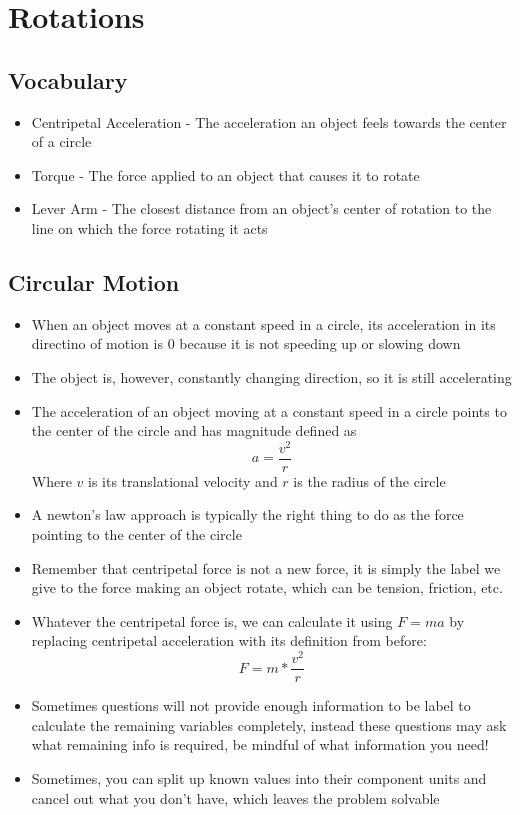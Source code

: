 \section{Rotations}

\subsection{Vocabulary}
\begin{itemize}
    \item Centripetal Acceleration - The acceleration an object feels towards the center of a circle
    \item Torque - The force applied to an object that causes it to rotate
    \item Lever Arm - The closest distance from an object's center of rotation to the line on which the force rotating it acts
\end{itemize}

\subsection{Circular Motion}
\begin{itemize}
    \item When an object moves at a constant speed in a circle, its acceleration in its directino of motion is 0 because it is not speeding up or slowing down
    \item The object is, however, constantly changing direction, so it is still accelerating
    \item The acceleration of an object moving at a constant speed in a circle points to the center of the circle and has magnitude defined as \[a=\frac{v^2}{r}\] Where \(v\) is its translational velocity and \(r\) is the radius of the circle
    \item A newton's law approach is typically the right thing to do as the force pointing to the center of the circle 
    \item Remember that centripetal force is not a new force, it is simply the label we give to the force making an object rotate, which can be tension, friction, etc.
    \item Whatever the centripetal force is, we can calculate it using \(F=ma\) by replacing centripetal acceleration with its definition from before: \[F=m*\frac{v^2}{r}\]
    \item Sometimes questions will not provide enough information to be label to calculate the remaining variables completely, instead these questions may ask what remaining info is required, be mindful of what information you need!
    \item Sometimes, you can split up known values into their component units and cancel out what you don't have, which leaves the problem solvable
\end{itemize}

